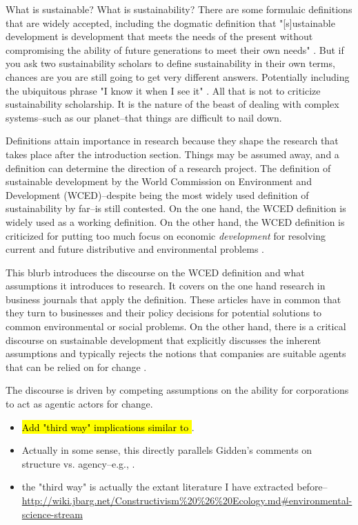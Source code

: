 
What is sustainable? What is sustainability? There are some formulaic definitions that are widely accepted, including the dogmatic definition that "[s]ustainable development is development that meets the needs of the present without compromising the ability of future generations to meet their own needs" \citep[IV]{WCED1987}. But if you ask two sustainability scholars to define sustainability in their own terms, chances are you are still going to get very different answers. Potentially including the ubiquitous phrase "I know it when I see it" \citep{White2013}. All that is not to criticize sustainability scholarship. It is the nature of the beast of dealing with complex systems--such as our planet--that things are difficult to nail down.

Definitions attain importance in research because they shape the research that takes place after the introduction section. Things may be assumed away, and a definition can determine the direction of a research project. The definition of sustainable development by the World Commission on Environment and Development (WCED)--despite being the most widely used definition of sustainability by far--is still contested. On the one hand, the WCED definition is widely used as a working definition. On the other hand, the WCED definition is criticized for putting too much focus on economic \textit{development} for resolving current and future distributive and environmental problems \citep[e.g.,][6f.]{Constanza2014a}.

This blurb introduces the discourse on the WCED definition and what assumptions it introduces to research. It covers on the one hand research in business journals that apply the definition. These articles have in common that they turn to businesses and their policy decisions for potential solutions to common environmental or social problems. On the other hand, there is a critical 
discourse on sustainable development that explicitly discusses the inherent assumptions and typically rejects the notions that companies are suitable agents that can be relied on for change \citep[e.g.,][]{Banerjee2003}.

The discourse is driven by competing assumptions on the ability for corporations to act as agentic actors for change. 
\begin{itemize}
	\item \hl{Add "third way" implications similar to \citet{Giddens1979}}.	
	\item Actually in some sense, this directly parallels Gidden's comments on structure vs. agency--e.g., \citet{Heikkurinen2019}.
	\item the "third way" is actually the extant literature I have extracted before--\url{http://wiki.jbarg.net/Constructivism%20%26%20Ecology.md#environmental-science-stream}
\end{itemize}
